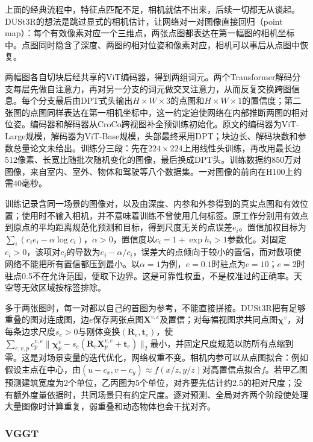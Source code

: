 上面的经典流程中，特征点匹配不足，相机就估不出来，后续一切都无从谈起。DUSt3R的想法是跳过显式的相机估计，让网络对一对图像直接回归（point map）：每个有效像素对应一个三维点，两张点图都表达在第一幅图的相机坐标中。点图同时隐含了深度、两图的相对位姿和像素对应，相机可以事后从点图中恢复。

两幅图各自切块后经共享的ViT编码器，得到两组词元。两个Transformer解码分支每层先做自注意力，再对另一分支的词元做交叉注意力，从而反复交换跨图信息。每个分支最后由DPT式头输出$H\times W\times3$的点图和$H\times W\times1$的置信度；第二张图的点图同样表达在第一相机坐标中，这一约定迫使网络在内部推断两图的相对位姿。编码器和解码器从CroCo跨视图补全预训练初始化。原文的编码器为ViT-Large规模，解码器为ViT-Base规模，头部最终采用DPT；块边长、解码块数和参数总量论文未给出。训练分三段：先在$224\times224$上用线性头训练，再改用最长边512像素、长宽比随批次随机变化的图像，最后换成DPT头。训练数据约850万对图像，来自室内、室外、物体和驾驶等八个数据集。一对图像的前向在H100上约需40毫秒。

训练记录含同一场景的图像对，以及由深度、内参和外参得到的真实点图和有效位置；使用时不输入相机，并不意味着训练不曾使用几何标签。原工作分别用有效点到原点的平均距离规范化预测和目标，得到尺度无关的点误差$e_i$。置信加权目标为$\sum_i(c_i e_i-\alpha\log c_i)$，$\alpha>0$，置信度以$c_i=1+\exp h_i>1$参数化。对固定$e_i>0$，该项对$c_i$的导数为$e_i-\alpha/c_i$，误差大的点倾向于较小的置信，而对数项使网络不能把所有置信都压到最小。以$\alpha=1$为例，$e=0.1$时驻点为$c=10$；$e=2$时驻点0.5不在允许范围，便取下边界。这是可靠性权重，不是校准过的正确率。天空等无效区域按标签排除。

多于两张图时，每一对都以自己的首图为参考，不能直接拼接。DUSt3R把有足够重叠的图对连成图，边$e$保存两张点图$\bm X^{v,e}$及置信；对每幅视图求共同点图$\bm\chi^v$，对每条边求尺度$s_e>0$与刚体变换$(\bm R_e,\bm t_e)$，使$\sum_{e,v,p}c_p^{v,e}\lVert\bm\chi_p^v-s_e(\bm R_e\bm X_p^{v,e}+\bm t_e)\rVert_2$最小，并固定尺度规范以防所有点缩到零。这是对场景变量的迭代优化，网络权重不变。相机内参可以从点图拟合：例如假设主点在中心，由$(u-c_x,v-c_y)\approx f(x/z,y/z)$对高置信点拟合$f$。若甲乙图预测建筑宽度为2个单位，乙丙图为5个单位，对齐要先估计约2.5的相对尺度；没有额外度量依据时，共同场景只有约定尺度。逐对预测、全局对齐两个阶段使处理大量图像时计算重复，弱重叠和动态物体也会干扰对齐。

\subsubsection{VGGT}
\label{sec:vision-recognition-vggt}

